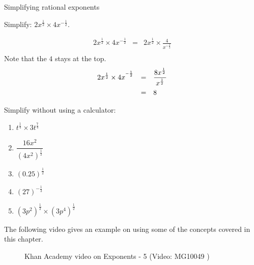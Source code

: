 \begin{wex}
{%
Simplifying rational exponents
}

{
Simplify:
$ 2x^{\frac{1}{2}}\times 4x^{-\frac{1}{2}}. $
}
{%
\begin{eqnarray*}
 2x^{\frac{1}{2}} \times 4x^{-\frac{1}{2}} & = & 2x^{\frac{1}{2}} \times \frac{4}{x^{-\frac{1}{2}}} \\
\end{eqnarray*}
Note that the $4$ stays at the top.\\

\begin{equation*}
 \begin{array}{rcl}
 2x^{\frac{1}{2}} \times 4x^{^{-\frac{1}{2}}} & = & \dfrac{8x^{\frac{1}{2}}}{x^{\frac{1}{2}}} \vspace{5pt} \\
					     & = & 8 
 \end{array}

\end{equation*}




}
\end{wex}

\begin{exercises}{}{
Simplify without using a calculator:
\begin{multicols}{2}
\begin{enumerate}[label=\textbf{\arabic*}., itemsep=5pt]
 \item $ t^{\frac{1}{4}} \times 3t^{\frac{7}{4}} $
 \item $ \dfrac{16x^2}{(4x^2)^{\frac{1}{2}}} $
 \item $ (0.25)^{\frac{1}{2}} $
 \item $ (27)^{-\frac{1}{3}} $
 \item $ (3p^2)^{\frac{1}{2}} \times (3p^4)^{\frac{1}{2}} $
\end{enumerate}
\end{multicols}
}
\end{exercises}


The following video gives an example on using some of the concepts covered in this chapter.
\setcounter{subfigure}{0}
\begin{figure}[H] %
\textnormal{Khan Academy video on Exponents - 5}\vspace{.1in} \nopagebreak
\label{m38359*yt-media5}\label{m38359*yt-video5}
 { (Video:  MG10049 )}
\end{figure}    


